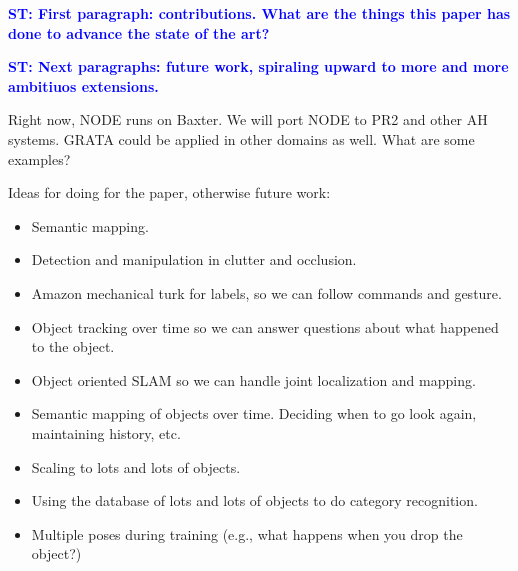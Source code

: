 \documentclass[conference]{IEEEtran}
\newcommand{\stnote}[1]{\textcolor{blue}{\textbf{ST: #1}}}
\begin{document}
\stnote{First paragraph:  contributions.  What are the things this paper has done to advance the state of the art?}

\stnote{Next paragraphs: future work, spiraling upward to more and
  more ambitiuos extensions.}

Right now, NODE runs on Baxter. We will port NODE to PR2 and other AH systems.
GRATA could be applied in other domains as well.  What are some examples?

Ideas for doing for the paper, otherwise future work: 
\begin{itemize}
\item Semantic mapping. 
\item Detection and manipulation in clutter and occlusion.
\item Amazon mechanical turk for labels, so we can follow commands and gesture.
\item Object tracking over time so we can answer questions about what
  happened to the object.
\item Object oriented SLAM so we can handle joint localization and mapping.
\item Semantic mapping of objects over time.  Deciding when to go look
  again, maintaining history, etc. 
\item Scaling to lots and lots of objects.
\item Using the database of lots and lots of objects to do category recognition.
\item Multiple poses during training (e.g., what happens when you drop
  the object?)
\end{itemize}

%



\end{document}
